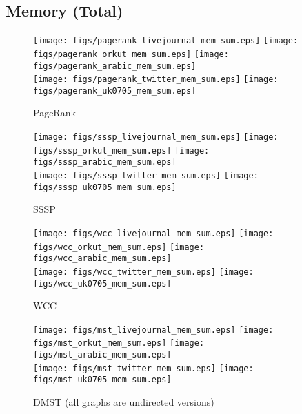 \documentclass{article}
\newcommand{\bline}[1][1]{\vspace{#1\baselineskip}}
\begin{document}
\pagebreak
\subsection{Memory (Total)}
\begin{figure}[!h]
  \bline[1]
  \centering
  \texttt{[image: figs/pagerank\_livejournal\_mem\_sum.eps]}\hspace{1em}%
  \texttt{[image: figs/pagerank\_orkut\_mem\_sum.eps]}\hspace{1em}%
  \texttt{[image: figs/pagerank\_arabic\_mem\_sum.eps]}\\
  \texttt{[image: figs/pagerank\_twitter\_mem\_sum.eps]}\hspace{1em}%
  \texttt{[image: figs/pagerank\_uk0705\_mem\_sum.eps]}
  \caption{PageRank}
\end{figure}

\begin{figure}[!h]
  \bline[3.5]
  \centering
  \texttt{[image: figs/sssp\_livejournal\_mem\_sum.eps]}\hspace{1em}%
  \texttt{[image: figs/sssp\_orkut\_mem\_sum.eps]}\hspace{1em}%
  \texttt{[image: figs/sssp\_arabic\_mem\_sum.eps]}\\
  \texttt{[image: figs/sssp\_twitter\_mem\_sum.eps]}\hspace{1em}%
  \texttt{[image: figs/sssp\_uk0705\_mem\_sum.eps]}
  \caption{SSSP}
\end{figure}

\begin{figure}[!h]
  \bline[3.5]
  \centering
  \texttt{[image: figs/wcc\_livejournal\_mem\_sum.eps]}\hspace{1em}%
  \texttt{[image: figs/wcc\_orkut\_mem\_sum.eps]}\hspace{1em}%
  \texttt{[image: figs/wcc\_arabic\_mem\_sum.eps]}\\
  \texttt{[image: figs/wcc\_twitter\_mem\_sum.eps]}\hspace{1em}%
  \texttt{[image: figs/wcc\_uk0705\_mem\_sum.eps]}
  \caption{WCC}
\end{figure}

\begin{figure}[!h]
  \bline[3.5]
  \centering
  \texttt{[image: figs/mst\_livejournal\_mem\_sum.eps]}\hspace{1em}%
  \texttt{[image: figs/mst\_orkut\_mem\_sum.eps]}\hspace{1em}%
  \texttt{[image: figs/mst\_arabic\_mem\_sum.eps]}\\
  \texttt{[image: figs/mst\_twitter\_mem\_sum.eps]}\hspace{1em}%
  \texttt{[image: figs/mst\_uk0705\_mem\_sum.eps]}
  \caption{DMST (all graphs are undirected versions)}
\end{figure}
\end{document}
